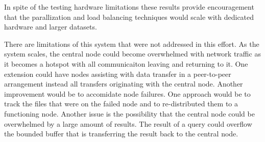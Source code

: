 \documentclass{article}
\newenvironment{Figure}
               {\par\medskip\noindent\minipage{\linewidth}}
               {\endminipage\par\medskip}
\begin{document}
\begin{multicols}{2}
\begin{Figure}
  \centering
  \noindent{}
\end{Figure}


In spite of the testing hardware limitations these results provide encouragement that the parallization and load balancing techniques would scale with dedicated hardware and larger datasets.



There are limitations of this system that were not addressed in this effort.  As the system scales, the central node could become overwhelmed with network traffic as it becomes a hotspot with all communicaiton leaving and returning to it. One extension could have nodes assisting with data transfer in a peer-to-peer arrangement instead all transfers originating with the central node.  Another improvement would be to accomidate node failures. One approach would be to track the files that were on the failed node and to re-distributed them to a functioning node.  Another issue is the possibility that the central node could be overwhelmed by a large amount of results. The result of a query could overflow the bounded buffer that is transferring the result back to the central node.   



\end{multicols}
\end{document}
